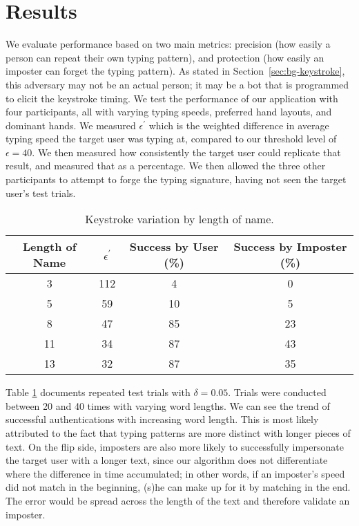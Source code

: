 \documentclass[11pt]{article}
\begin{document}
\section{Results}
\label{sec:results}
We evaluate performance based on two main metrics: precision (how easily a person can repeat their own typing pattern), and protection (how easily an imposter can forget the typing pattern). As stated in Section~\ref{sec:bg-keystroke}, this adversary may not be an actual person; it may be a bot that is programmed to elicit the keystroke timing.  We test the performance of our application with four participants, all with varying typing speeds, preferred hand layouts, and dominant hands.  We measured $\epsilon^{'}$ which is the weighted difference in average typing speed the target user was typing at, compared to our threshold level of $\epsilon=40$. We then measured how consistently the target user could replicate that result, and measured that as a percentage. We then allowed the three other participants to attempt to forge the typing signature, having not seen the target user's test trials.

\begin{table}[h!]
\centering
\begin{tabular}{||c c c c||} 
 \hline
 Length of Name & $\epsilon^{'}$ & Success by User (\%) & Success by Imposter (\%) \\ [0.5ex] 
 \hline\hline
 3 & 112 & 4 & 0 \\ 
 5 & 59 & 10 & 5 \\
 8 & 47 & 85 & 23 \\ 
 11 & 34 & 87 & 43 \\
 13 & 32 & 87 & 35 \\ [1ex] 
 \hline
\end{tabular}
\caption{Keystroke variation by length of name.}
\label{table:1}
\end{table}

Table \ref{table:1} documents repeated test trials with $\delta=0.05$.  Trials were conducted between 20 and 40 times with varying word lengths.  We can see the trend of successful authentications with increasing word length.  This is most likely attributed to the fact that typing patterns are more distinct with longer pieces of text.  On the flip side, imposters are also more likely to successfully impersonate the target user with a longer text, since our algorithm does not differentiate where the difference in time accumulated; in other words, if an imposter's speed did not match in the beginning, (s)he can make up for it by matching in the end.  The error would be spread across the length of the text and therefore validate an imposter.
\end{document}
